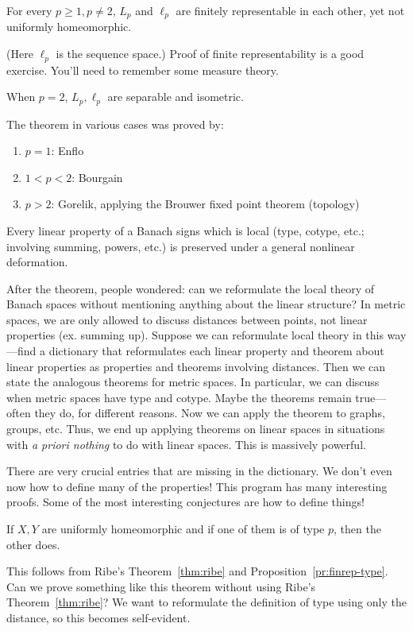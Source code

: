 \begin{thm}
For every $p\ge 1,p\ne2$, $L_p$ and $\ell_p$ are finitely representable in each other, yet not uniformly homeomorphic.
\end{thm}
(Here $\ell_p$ is the sequence space.) 
Proof of finite representability is a good exercise. You'll need to remember some measure theory.

When $p=2$, $L_p,\ell_p$ are separable and isometric.

The theorem in various cases was proved by:
\begin{enumerate}
\item
$p=1$: Enflo
\item
$1<p<2$: Bourgain
\item
$p>2$: Gorelik, applying the Brouwer fixed point theorem (topology)
\end{enumerate}

Every linear property of a Banach signs which is local (type, cotype, etc.; involving summing, powers, etc.) is preserved under a general nonlinear deformation.

After the theorem, people wondered: can we reformulate the local theory of Banach spaces without mentioning anything about the linear structure? 
In metric spaces, we are only allowed to discuss distances between points, not linear properties (ex. summing up). Suppose we can reformulate local theory in this way---find a dictionary that reformulates each linear property and theorem about linear properties as properties and theorems involving distances. Then we can state the analogous theorems for metric spaces. In particular, we can discuss when metric spaces have type and cotype. Maybe the theorems remain true---often they do, for different reasons. Now we can apply the theorem to graphs, groups, etc. %
Thus, we end up applying theorems on linear spaces in situations with \emph{a priori nothing} to do with linear spaces. This is massively powerful.

There are very crucial entries that are missing in the dictionary. We don't even now how to define many of the properties! %
This program has many interesting proofs. Some of the most interesting conjectures are how to define things!

\begin{cor}
If $X,Y$ are uniformly homeomorphic and if one of them is of type $p$, then the other does. 
\end{cor}
This follows from Ribe's Theorem~\ref{thm:ribe} and Proposition~\ref{pr:finrep-type}. Can we prove something like this theorem without using Ribe's Theorem~\ref{thm:ribe}?
We want to reformulate the definition of type using only the distance, so this becomes self-evident.

